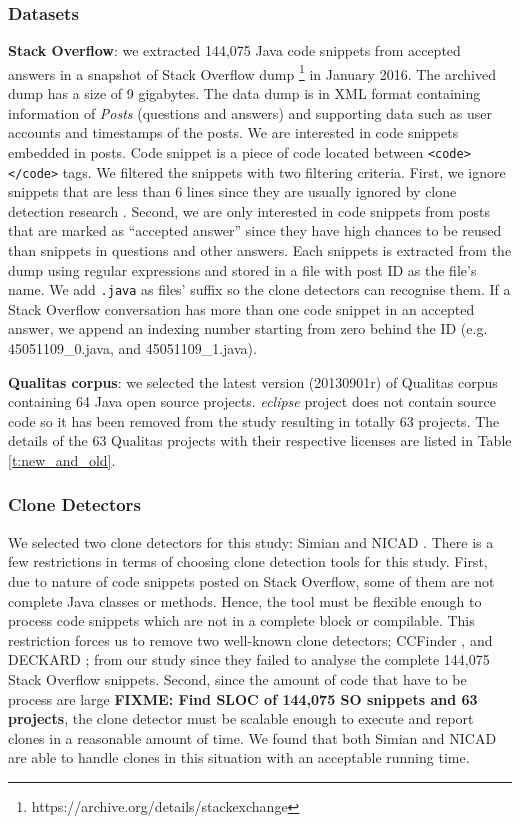 \documentclass{sig-alternate-05-2015}
\newcommand\FIXME[1]{\textbf{FIXME: #1}}
\begin{document}
\subsubsection{Datasets}
\textbf{Stack Overflow}: we extracted 144,075 Java code snippets from accepted answers in a snapshot of Stack Overflow dump \footnote{https://archive.org/details/stackexchange} in January 2016. The archived dump has a size of 9 gigabytes. The data dump is in XML format containing information of \textit{Posts} (questions and answers) and supporting data such as user accounts and timestamps of the posts. We are interested in code snippets embedded in posts. Code snippet is a piece of code located between \texttt{<code></code>} tags. We filtered the snippets with two filtering criteria. First, we ignore snippets that are less than 6 lines since they are usually ignored by clone detection research \cite{something}. Second, we are only interested in code snippets from posts that are marked as ``accepted answer'' since they have high chances to be reused than snippets in questions and other answers. Each snippets is extracted from the dump using regular expressions and stored in a file with post ID as the file's name. We add \texttt{.java} as files' suffix so the clone detectors can recognise them. If a Stack Overflow conversation has more than one code snippet in an accepted answer, we append an indexing number starting from zero behind the ID (e.g. 45051109\_0.java, and 45051109\_1.java).

\textbf{Qualitas corpus}: we selected the latest version (20130901r) of Qualitas corpus \cite{QualitasCorpus} containing 64 Java open source projects. \textit{eclipse} project does not contain source code so it has been removed from the study resulting in totally 63 projects. The details of the 63 Qualitas projects with their respective licenses are listed in Table \ref{t:new_and_old}.

\subsubsection{Clone Detectors}
We selected two clone detectors for this study: Simian \cite{simian} and NICAD \cite{Cordy,Roy2008}. There is a few restrictions in terms of choosing clone detection tools for this study. First, due to nature of code snippets posted on Stack Overflow, some of them are not complete Java classes or methods. Hence, the tool must be flexible enough to process code snippets which are not in a complete block or compilable. This restriction forces us to remove two well-known clone detectors; CCFinder \cite{Kamiya2002}, and DECKARD \cite{Jiang2007a}; from our study since they failed to analyse the complete 144,075 Stack Overflow snippets. Second, since the amount of code that have to be process are large \FIXME{Find SLOC of 144,075 SO snippets and 63 projects}, the clone detector must be scalable enough to execute and report clones in a reasonable amount of time. We found that both Simian and NICAD are able to handle clones in this situation with an acceptable running time.
\end{document}
